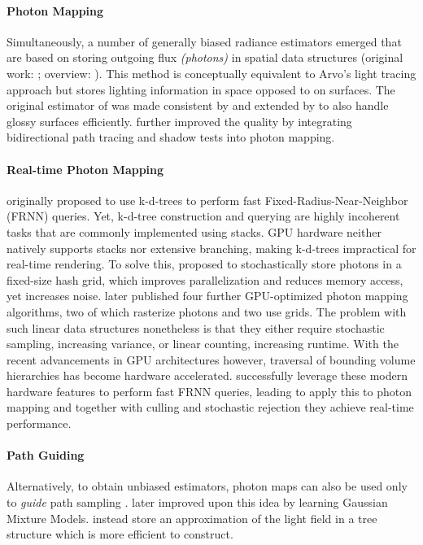 \paragraph{Photon Mapping}
Simultaneously, a number of generally biased radiance estimators emerged that are based on storing outgoing flux \emph{(photons)} in spatial data structures (original work: \cite{jensen1996}; overview: \cite{kang2016}).
This method is conceptually equivalent to Arvo's light tracing approach \parencite{arvo1986} but stores lighting information in space opposed to on surfaces.
The original estimator of \textcite{jensen1996} was made consistent by \textcite{hachisuka2008,knaus2011} and extended by \textcite{hachisuka2009a} to also handle glossy surfaces efficiently.
\textcite{georgiev2012} further improved the quality by integrating bidirectional path tracing and shadow tests into photon mapping.

\paragraph{Real-time Photon Mapping}
\textcite{jensen1996} originally proposed to use k-d-trees to perform fast Fixed-Radius-Near-Neighbor (FRNN) queries.
Yet, k-d-tree construction and querying are highly incoherent tasks that are commonly implemented using stacks.
GPU hardware neither natively supports stacks nor extensive branching, making k-d-trees impractical for real-time rendering.
To solve this, \textcite{hachisuka2010} proposed to stochastically store photons in a fixed-size hash grid, which improves parallelization and reduces memory access, yet increases noise.
\textcite{mara2013} later published four further GPU-optimized photon mapping algorithms, two of which rasterize photons and two use grids.
The problem with such linear data structures nonetheless is that they either require stochastic sampling, increasing variance, or linear counting, increasing runtime.
With the recent advancements in GPU architectures however, traversal of bounding volume hierarchies has become hardware accelerated.
\textcite{evangelou2021} successfully leverage these modern hardware features to perform fast FRNN queries, leading \textcite{kern2023} to apply this to photon mapping and together with culling and stochastic rejection they achieve real-time performance.

\paragraph{Path Guiding}
Alternatively, to obtain unbiased estimators, photon maps \parencite{jensen1996} can also be used only to \emph{guide} path sampling \parencite{jensen1995}.
\textcite{vorba2014} later improved upon this idea by learning Gaussian Mixture Models.
\textcite{muller2017} instead store an approximation of the light field in a tree structure which is more efficient to construct.

